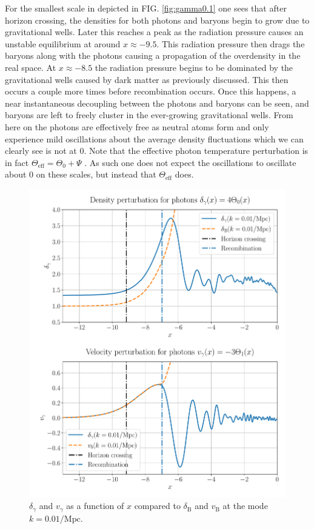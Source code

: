 \documentclass[%
reprint,
 amsmath,amssymb,
 aps,
]{revtex4-2}
\begin{document}
For the smallest scale in depicted in FIG. \ref{fig:gamma0.1} one sees that after horizon crossing, the densities for both photons and baryons begin to grow due to gravitational wells. Later this reaches a peak as the radiation pressure causes an unstable equilibrium at around $x\approx-9.5$. This radiation pressure then drags the baryons along with the photons causing a propagation of the overdensity in the real space. At $x\approx-8.5$ the radiation pressure begins to be dominated by the gravitational wells caused by dark matter as previously discussed. This then occurs a couple more times before recombination occurs. Once this happens, a near instantaneous decoupling between the photons and baryons can be seen, and baryons are left to freely cluster in the ever-growing gravitational wells. From here on the photons are effectively free as neutral atoms form and only experience mild oscillations about the average density fluctuations which we can clearly see is not at 0. Note that the effective photon temperature perturbation is in fact $\Theta_\text{eff}=\Theta_0+\Psi$ \cite{AST5220LectureNotes}. As such one does not expect the oscillations to oscillate about $0$ on these scales, but instead that $\Theta_\text{eff}$ does.

\begin{figure}[ht!]
	\includegraphics[width = \linewidth]{Figures/gamma0.01.pdf}
	\caption{$\delta_\gamma$ and $v_\gamma$ as a function of $x$ compared to $\delta_\text{B}$ and $v_\text{B}$ at the mode $k=0.01/\text{Mpc}$.}
	\label{fig:gamma0.01}
\end{figure}
\end{document}

